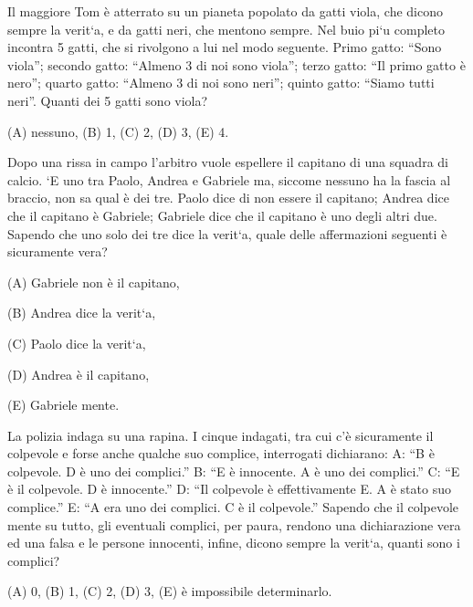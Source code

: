 \begin{esercizio}
    \label{ex:archimede_2010_triennio_19}
    Il maggiore Tom è atterrato su un pianeta popolato da gatti viola, che dicono
    sempre la verit`{a}, e da gatti neri, che mentono sempre.
    Nel buio pi`{u} completo incontra 5 gatti, che si rivolgono a lui nel modo seguente.
    Primo gatto: “Sono viola”;
    secondo gatto: “Almeno 3 di noi sono viola”;
    terzo gatto: “Il primo gatto è nero”;
    quarto gatto: “Almeno 3 di noi sono neri”;
    quinto gatto: “Siamo tutti neri”.
    Quanti dei 5 gatti sono viola?

    (A) nessuno, \quad (B) 1, \quad (C) 2, \quad (D) 3, \quad (E) 4.
\end{esercizio}

\begin{esercizio}
    \label{ex:archimede_2011_biennio_13}
    Dopo una rissa in campo l’arbitro vuole espellere il capitano di una squadra di calcio.
    `{E} uno tra Paolo, Andrea e Gabriele ma, siccome nessuno ha la fascia al braccio, non sa qual è dei tre.
    Paolo dice di non essere il capitano;
    Andrea dice che il capitano è Gabriele;
    Gabriele dice che il capitano è uno degli altri due.
    Sapendo che uno solo dei tre dice la verit`{a}, quale delle affermazioni seguenti è sicuramente vera?

    (A) Gabriele non è il capitano,

    (B) Andrea dice la verit`{a},

    (C) Paolo dice la verit`{a},

    (D) Andrea è il capitano,

    (E) Gabriele mente.
\end{esercizio}

\begin{esercizio}
    \label{ex:archimede_2011_triennio_23}
    La polizia indaga su una rapina.
    I cinque indagati, tra cui c’è sicuramente il colpevole e forse anche qualche suo complice, interrogati
    dichiarano:
    A: “B è colpevole.
    D è uno dei complici.”
    B: “E è innocente.
    A è uno dei complici.”
    C: “E è il colpevole.
    D è innocente.”
    D: “Il colpevole è effettivamente E.
    A è stato suo complice.”
    E: “A era uno dei complici.
    C è il colpevole.”
    Sapendo che il colpevole mente su tutto, gli eventuali complici, per paura, rendono una dichiarazione vera ed una
    falsa e le persone innocenti, infine, dicono sempre la verit`{a}, quanti sono i complici?

    (A) 0, \quad (B) 1, \quad (C) 2, \quad (D) 3, \quad (E) è impossibile determinarlo.
\end{esercizio}

